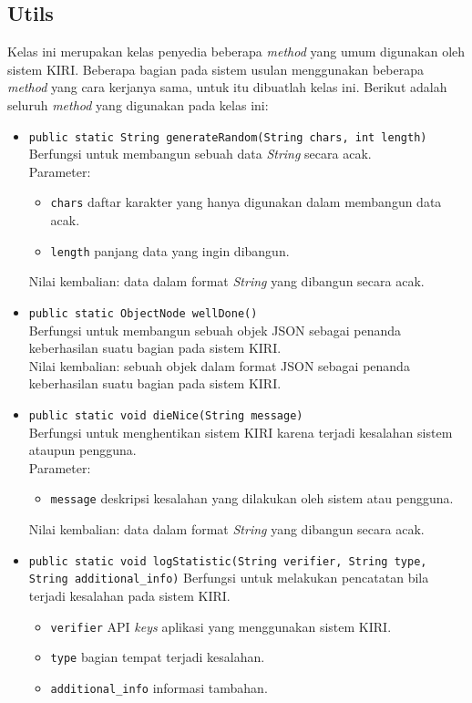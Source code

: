 \subsection{Utils}
\label{sec:utils}
Kelas ini merupakan kelas penyedia beberapa \textit{method} yang umum digunakan oleh sistem KIRI. Beberapa bagian pada sistem usulan menggunakan beberapa \textit{method} yang cara kerjanya sama, untuk itu dibuatlah kelas ini. Berikut adalah seluruh \textit{method} yang digunakan pada kelas ini:
\begin{itemize}
	\item \texttt{public static String generateRandom(String chars, int length)}\\
	Berfungsi untuk membangun sebuah data \textit{String} secara acak.\\
	Parameter:
	\begin{itemize}
		\item \texttt{chars} daftar karakter yang hanya digunakan dalam membangun data acak.
		\item \texttt{length} panjang data yang ingin dibangun.
	\end{itemize}
	Nilai kembalian: data dalam format \textit{String} yang dibangun secara acak.
	\item \texttt{public static ObjectNode wellDone()}\\
	Berfungsi untuk membangun sebuah objek JSON sebagai penanda keberhasilan suatu bagian pada sistem KIRI.\\
	Nilai kembalian: sebuah objek dalam format JSON sebagai penanda keberhasilan suatu bagian pada sistem KIRI.
	\item \texttt{public static void dieNice(String message)}\\
	Berfungsi untuk menghentikan sistem KIRI karena terjadi kesalahan sistem ataupun pengguna.\\
	Parameter:
	\begin{itemize}
		\item \texttt{message} deskripsi kesalahan yang dilakukan oleh sistem atau pengguna.
	\end{itemize}
	Nilai kembalian: data dalam format \textit{String} yang dibangun secara acak.
	\item \texttt{public static void logStatistic(String verifier, String type, String additional\_info)}
	Berfungsi untuk melakukan pencatatan bila terjadi kesalahan pada sistem KIRI.\\
	\begin{itemize}
		\item \texttt{verifier} API \textit{keys} aplikasi yang menggunakan sistem KIRI.
		\item \texttt{type} bagian tempat terjadi kesalahan.
		\item \texttt{additional\_info} informasi tambahan.
	\end{itemize}
\end{itemize}

